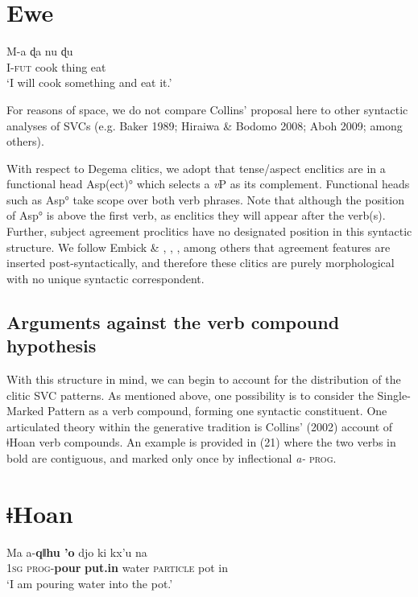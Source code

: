 \documentclass[output=paper]{langsci/langscibook}
\begin{document}
\chapter[Ewe]{Ewe}
\label{bkm:Ref375319560}\gll M-a  ɖa    nu    ɖu\\
     I-\textsc{fut}  cook  thing  eat\\
\glt ‘I will cook something and eat it.’ \citep[490-491]{Collins1997}
\z

For reasons of space, we do not compare Collins’ proposal here to other syntactic analyses of SVCs (e.g. Baker 1989; Hiraiwa \& Bodomo 2008; Aboh 2009; among others). 

With respect to Degema clitics, we adopt that tense/aspect enclitics are in a functional head Asp(ect)° which selects a \textit{v}P as its complement. Functional heads such as Asp° take scope over both verb phrases. Note that although the position of Asp° is above the first verb, as enclitics they will appear after the verb(s). Further, subject agreement proclitics have no designated position in this syntactic structure. We follow Embick \& \citet{Noyer2007}, \citet{Kramer2010}, \citet{Norris2014}, among others that agreement features are inserted post-syntactically, and therefore these clitics are purely morphological with no unique syntactic correspondent. 

\section{Arguments against the verb compound hypothesis}
\label{bkm:Ref449523633}
With this structure in mind, we can begin to account for the distribution of the clitic SVC patterns. As mentioned above, one possibility is to consider the Single-Marked Pattern as a verb compound, forming one syntactic constituent. One articulated theory within the generative tradition is Collins’ (2002) account of ǂHoan verb compounds. An example is provided in (21) where the two verbs in bold are contiguous, and marked only once by inflectional \textit{a- }\textsc{prog}.

\chapter[ǂHoan]{ǂHoan}
\label{bkm:Ref449455636}\gll Ma  a-\textbf{qǁhu    {\textbar}’o}    djo    ki      kx’u    na\\
     \textsc{1sg}   \textsc{prog}{}-\textbf{pour}  \textbf{put.in}  water  \textsc{particle}  pot    in\\
\glt ‘I am pouring water into the pot.’ \citep[1]{Collins2002}
\z
\end{document}
